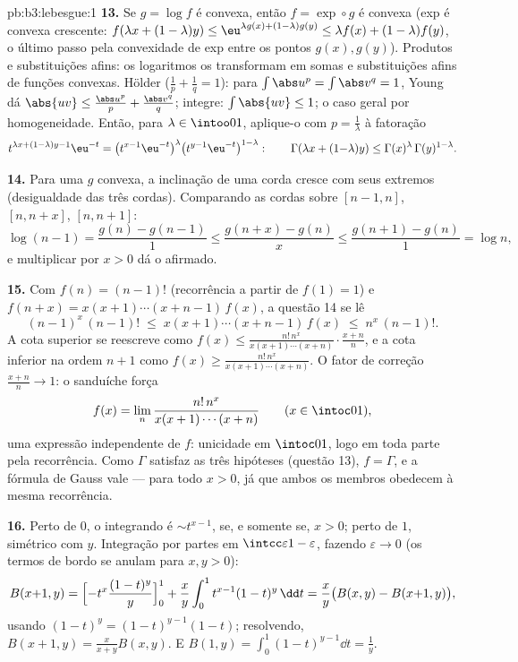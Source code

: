 \begin{solution}{pb:b3:lebesgue:1}
\textbf{13.} Se $g = \log f$ é convexa, então $f = \exp\circ g$
é convexa (exp é convexa crescente: $f(\lambda x + (1-\lambda)
y) \leq \eu^{\lambda g(x) + (1-\lambda)g(y)} \leq \lambda f(x)
+ (1-\lambda)f(y)$, o último passo pela convexidade de exp entre
os pontos $g(x), g(y)$). Produtos e substituições afins:
os logaritmos os transformam em somas e substituições afins de
funções convexas. Hölder ($\frac1p + \frac1q = 1$): para
$\int\abs u^p = \int\abs v^q = 1$, Young dá $\abs{uv} \leq
\frac{\abs u^p}p + \frac{\abs v^q}q$; integre: $\int\abs{uv}
\leq 1$; o caso geral por homogeneidade. Então, para $\lambda
\in \intoo01$, aplique-o com $p = \frac1\lambda$ à
fatoração
\[
t^{\lambda x + (1-\lambda)y - 1}\eu^{-t}
= \bigl(t^{x-1}\eu^{-t}\bigr)^{\lambda}
\bigl(t^{y-1}\eu^{-t}\bigr)^{1-\lambda} :
\qquad
\Gamma(\lambda x + (1{-}\lambda)y) \leq
\Gamma(x)^\lambda\,\Gamma(y)^{1-\lambda} .
\]

\textbf{14.} Para uma $g$ convexa, a inclinação de uma corda cresce
com seus extremos (desigualdade das três cordas). Comparando as
cordas sobre $[n-1, n]$, $[n, n+x]$, $[n, n+1]$:
\[
\log(n-1) = \frac{g(n) - g(n-1)}1 \leq
\frac{g(n+x) - g(n)}x \leq \frac{g(n+1) - g(n)}1 = \log n,
\]
e multiplicar por $x > 0$ dá o afirmado.

\textbf{15.} Com $f(n) = (n-1)!$ (recorrência a partir de $f(1) = 1$)
e $f(n + x) = x(x+1)\cdots(x+n-1)\,f(x)$, a questão 14 se lê
\[
(n-1)^x\,(n-1)! \;\leq\; x(x+1)\cdots(x+n-1)\,f(x)
\;\leq\; n^x\,(n-1)! .
\]
A cota superior se reescreve como $f(x) \leq
\frac{n!\,n^x}{x(x+1)\cdots(x+n)}\cdot\frac{x+n}n$, e a
cota inferior na ordem $n+1$ como $f(x) \geq
\frac{n!\,n^x}{x(x+1)\cdots(x+n)}$. O fator de correção
$\frac{x+n}n \to 1$: o sanduíche força
\[
f(x) = \lim_n\frac{n!\,n^x}{x(x+1)\cdots(x+n)}
\qquad (x \in \intoc01),
\]
uma expressão independente de $f$: unicidade em $\intoc01$,
logo em toda parte pela recorrência. Como $\Gamma$ satisfaz
as três hipóteses (questão 13), $f = \Gamma$, e a fórmula de Gauss
vale --- para todo $x > 0$, já que ambos os membros obedecem à mesma
recorrência.

\textbf{16.} Perto de $0$, o integrando é $\sim t^{x-1}$,
 se, e somente se, $x > 0$; perto de $1$, simétrico com $y$.
Integração por partes em $\intcc\varepsilon{1-\varepsilon}$,
fazendo $\varepsilon \to 0$ (os termos de bordo se anulam para $x, y >
0$):
\[
B(x{+}1, y) = \Bigl[-t^x\frac{(1-t)^y}y\Bigr]_0^1 +
\frac xy\int_0^1t^{x-1}(1-t)^y\,\dd t
= \frac xy\bigl(B(x, y) - B(x{+}1, y)\bigr),
\]
usando $(1-t)^y = (1-t)^{y-1}(1 - t)$; resolvendo, $B(x+1, y) =
\frac{x}{x+y}B(x, y)$. E $B(1, y) =
\int_0^1(1-t)^{y-1}\dd t = \frac1y$.


\end{solution}
